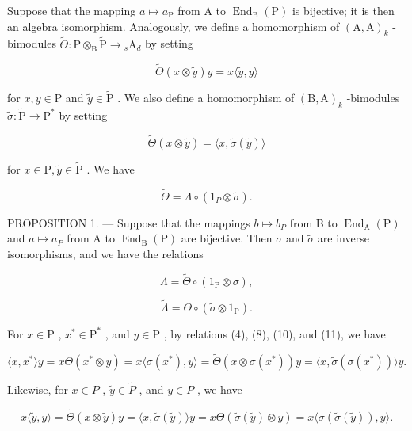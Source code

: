 Suppose that the mapping \(a \mapsto a_{\mathrm{P}}\) from A to \(\operatorname{End}_{\mathrm{B}}(\mathrm{P})\) is bijective; it is then an algebra isomorphism. Analogously, we define a homomorphism of \((\mathrm{A}, \mathrm{A})_k\) -bimodules \(\widetilde{\Theta}: \mathrm{P} \otimes_{\mathrm{B}} \widetilde{\mathrm{P}} \to {}_s \mathrm{A}_d\) by setting

\[
\widetilde {\Theta} (x \otimes \widetilde {y}) y = x \langle \widetilde {y}, y \rangle\tag{10}
\]

for \(x, y \in \mathrm{P}\) and \(\widetilde{y} \in \widetilde{\mathrm{P}}\) . We also define a homomorphism of \((\mathrm{B}, \mathrm{A})_k\) -bimodules \(\widetilde{\sigma}: \widetilde{\mathrm{P}} \to \mathrm{P}^*\) by setting

\[
\widetilde {\Theta} (x \otimes \widetilde {y}) = \langle x, \widetilde {\sigma} (\widetilde {y}) \rangle\tag{11}
\]

for \(x\in \mathrm{P},\widetilde{y}\in \widetilde{\mathrm{P}}\) . We have

\[
\widetilde {\Theta} = \Lambda \circ (1 _ {P} \otimes \widetilde {\sigma}).\tag{12}
\]

PROPOSITION 1. --- Suppose that the mappings \(b \mapsto b_{P}\) from B to \(\operatorname{End}_{\mathrm{A}}(\mathrm{P})\) and \(a \mapsto a_{P}\) from A to \(\operatorname{End}_{\mathrm{B}}(\mathrm{P})\) are bijective. Then \(\sigma\) and \(\widetilde{\sigma}\) are inverse isomorphisms, and we have the relations

\[
\Lambda = \widetilde {\Theta} \circ (1 _ {\mathrm{P}} \otimes \sigma),\tag{13}
\]

\[
\widetilde {\Lambda} = \Theta \circ (\widetilde {\sigma} \otimes 1 _ {\mathrm{P}}).\tag{14}
\]

For \(x \in \mathrm{P}\) , \(x^{*} \in \mathrm{P}^{*}\) , and \(y \in \mathrm{P}\) , by relations (4), (8), (10), and (11), we have

\[
\langle x, x ^ {*} \rangle y = x \Theta (x ^ {*} \otimes y) = x \langle \sigma (x ^ {*}), y \rangle = \widetilde {\Theta} (x \otimes \sigma (x ^ {*})) y = \langle x, \widetilde {\sigma} (\sigma (x ^ {*})) \rangle y.\tag{15}
\]

Likewise, for \(x \in P\) , \(\widetilde{y} \in \widetilde{P}\) , and \(y \in P\) , we have

\[
x \langle \widetilde {y}, y \rangle = \widetilde {\Theta} (x \otimes \widetilde {y}) y = \langle x, \widetilde {\sigma} (\widetilde {y}) \rangle y = x \Theta (\widetilde {\sigma} (\widetilde {y}) \otimes y) = x \langle \sigma (\widetilde {\sigma} (\widetilde {y})), y \rangle .\tag{16}
\]

